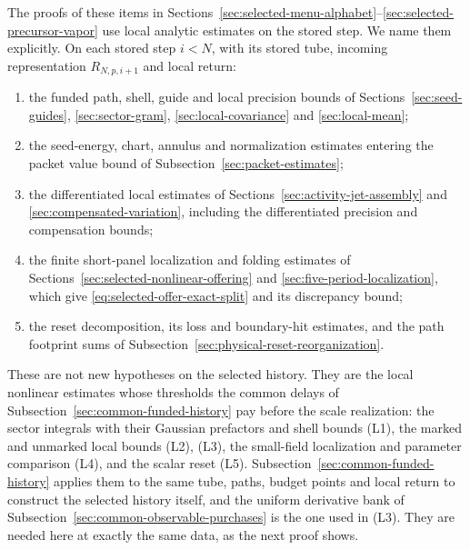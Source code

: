 The proofs of these items in
Sections~\ref{sec:selected-menu-alphabet}--\ref{sec:selected-precursor-vapor}
use local analytic estimates on the stored step. We name them
explicitly. On each stored step $i<N$, with its stored tube, incoming
representation $R_{N,p,i+1}$ and local return:
\begin{enumerate}
\item[(L1)] the funded path, shell, guide and local precision bounds of
 Sections~\ref{sec:seed-guides}, \ref{sec:sector-gram},
 \ref{sec:local-covariance} and \ref{sec:local-mean};
\item[(L2)] the seed-energy, chart, annulus and normalization estimates
 entering the packet value bound of Subsection~\ref{sec:packet-estimates};
\item[(L3)] the differentiated local estimates of
 Sections~\ref{sec:activity-jet-assembly} and
 \ref{sec:compensated-variation}, including the differentiated precision
 and compensation bounds;
\item[(L4)] the finite short-panel localization and folding estimates of
 Sections~\ref{sec:selected-nonlinear-offering} and
 \ref{sec:five-period-localization}, which give
 \eqref{eq:selected-offer-exact-split} and its discrepancy bound;
\item[(L5)] the reset decomposition, its loss and boundary-hit estimates,
 and the path footprint sums of
 Subsection~\ref{sec:physical-reset-reorganization}.
\end{enumerate}
These are not new hypotheses on the selected history. They are the
local nonlinear estimates whose thresholds the common delays of
Subsection~\ref{sec:common-funded-history} pay before the scale realization:
the sector integrals with their Gaussian prefactors and shell bounds (L1),
the marked and unmarked local bounds (L2), (L3), the small-field
localization and parameter comparison (L4), and the scalar reset (L5).
Subsection~\ref{sec:common-funded-history} applies them to the same tube,
paths, budget points and local return to construct the selected history
itself, and the uniform derivative bank of
Subsection~\ref{sec:common-observable-purchases} is the one used in (L3).
They are needed here at exactly the same data, as the next proof shows.

